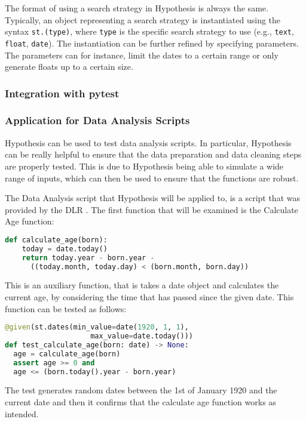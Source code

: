 \documentclass[runningheads]{llncs}
\begin{document}
The format of using a search strategy in Hypothesis is always the same. Typically, an object representing a search strategy is instantiated using the syntax \texttt{st.(type)}, where \texttt{type} is the specific search strategy to use (e.g., \texttt{text}, \texttt{float}, \texttt{date}). The instantiation can be further refined by specifying parameters. The parameters can for instance, limit the dates to a certain range or only generate floats up to a certain size.

\subsubsection{Integration with pytest}

\subsubsection{Application for Data Analysis Scripts}
Hypothesis can be used to test data analysis scripts. In particular, Hypothesis can be really helpful to ensure that the data preparation and data cleaning steps are properly tested. This is due to Hypothesis being able to simulate a wide range of inputs, which can then be used to ensure that the functions are robust.

The Data Analysis script that Hypothesis will be applied to, is a script that was provided by the DLR \cite{Stoffers2021Astronaut}. The first function that will be examined is the Calculate Age function:

\begin{lstlisting}[language=Python]
  def calculate_age(born):
    today = date.today()
    return today.year - born.year - 
      ((today.month, today.day) < (born.month, born.day))
\end{lstlisting}

This is an auxiliary function, that is takes a date object and calculates the current age, by considering the time that has passed since the given date. This function can be tested as follows:

\begin{lstlisting}[language=Python]
@given(st.dates(min_value=date(1920, 1, 1), 
                    max_value=date.today()))
def test_calculate_age(born: date) -> None:
  age = calculate_age(born)
  assert age >= 0 and 
  age <= (born.today().year - born.year)
\end{lstlisting}

The test generates random dates between the 1st of January 1920 and the current date and then it confirms that the calculate age function works as intended.
\end{document}
